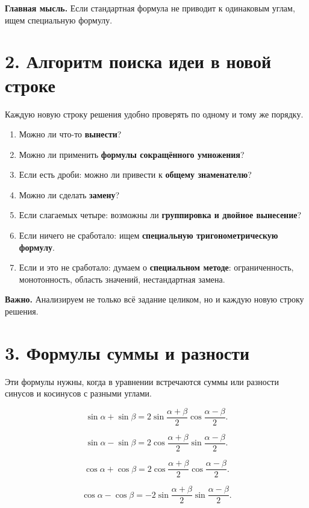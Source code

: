 \documentclass[a4paper,12pt]{article}
\newcommand{\sectionline}{\vspace{2mm}{\color{linegray}\hrule height 0.5pt}\vspace{2mm}}
\newcommand{\important}[1]{\textcolor{darkaccent}{\textbf{#1}}}
\begin{document}
\important{Главная мысль.} Если стандартная формула не приводит к одинаковым углам, ищем специальную формулу.

\sectionline

\section*{\textcolor{darkaccent}{2. Алгоритм поиска идеи в новой строке}}

Каждую новую строку решения удобно проверять по одному и тому же порядку.

\begin{enumerate}
\item Можно ли что-то \important{вынести}?
\item Можно ли применить \important{формулы сокращённого умножения}?
\item Если есть дроби: можно ли привести к \important{общему знаменателю}?
\item Можно ли сделать \important{замену}?
\item Если слагаемых четыре: возможны ли \important{группировка и двойное вынесение}?
\item Если ничего не сработало: ищем \important{специальную тригонометрическую формулу}.
\item Если и это не сработало: думаем о \important{специальном методе}: ограниченность, монотонность, область значений, нестандартная замена.
\end{enumerate}

\important{Важно.} Анализируем не только всё задание целиком, но и каждую новую строку решения.

\sectionline

\section*{\textcolor{darkaccent}{3. Формулы суммы и разности}}

Эти формулы нужны, когда в уравнении встречаются суммы или разности синусов и косинусов с разными углами.

\[
\sin \alpha+\sin \beta
=
2\sin\frac{\alpha+\beta}{2}\cos\frac{\alpha-\beta}{2}.
\]

\[
\sin \alpha-\sin \beta
=
2\cos\frac{\alpha+\beta}{2}\sin\frac{\alpha-\beta}{2}.
\]

\[
\cos \alpha+\cos \beta
=
2\cos\frac{\alpha+\beta}{2}\cos\frac{\alpha-\beta}{2}.
\]

\[
\cos \alpha-\cos \beta
=
-2\sin\frac{\alpha+\beta}{2}\sin\frac{\alpha-\beta}{2}.
\]
\end{document}
